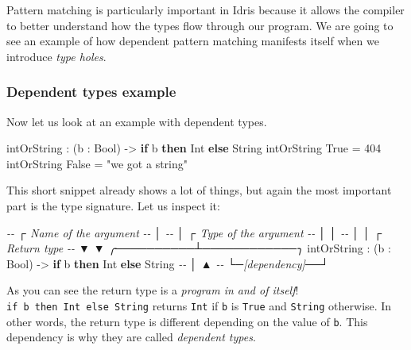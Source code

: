 \documentclass[
]{article}
\newenvironment{Shaded}{}{}
\newcommand{\CommentTok}[1]{\textcolor[rgb]{0.38,0.63,0.69}{\textit{#1}}}
\newcommand{\DataTypeTok}[1]{\textcolor[rgb]{0.56,0.13,0.00}{#1}}
\newcommand{\DecValTok}[1]{\textcolor[rgb]{0.25,0.63,0.44}{#1}}
\newcommand{\KeywordTok}[1]{\textcolor[rgb]{0.00,0.44,0.13}{\textbf{#1}}}
\newcommand{\NormalTok}[1]{#1}
\newcommand{\OperatorTok}[1]{\textcolor[rgb]{0.40,0.40,0.40}{#1}}
\newcommand{\OtherTok}[1]{\textcolor[rgb]{0.00,0.44,0.13}{#1}}
\newcommand{\StringTok}[1]{\textcolor[rgb]{0.25,0.44,0.63}{#1}}
\begin{document}
Pattern matching is particularly important in Idris because it allows
the compiler to better understand how the types flow through our
program. We are going to see an example of how dependent pattern
matching\cite{view_from_the_left} manifests itself when we introduce
\emph{type holes}.

\hypertarget{dependent-types-example}{%
\subsubsection{Dependent types example}\label{dependent-types-example}}

Now let us look at an example with dependent types.

\begin{Shaded}
\begin{Highlighting}[]
\NormalTok{intOrString }\OperatorTok{:}\NormalTok{ (b }\OperatorTok{:} \DataTypeTok{Bool}\NormalTok{) }\OtherTok{{-}\textgreater{}} \KeywordTok{if}\NormalTok{ b }\KeywordTok{then} \DataTypeTok{Int} \KeywordTok{else} \DataTypeTok{String}
\NormalTok{intOrString }\DataTypeTok{True} \OtherTok{=} \DecValTok{404}
\NormalTok{intOrString }\DataTypeTok{False} \OtherTok{=} \StringTok{"we got a string"}
\end{Highlighting}
\end{Shaded}

This short snippet already shows a lot of things, but again the most
important part is the type signature. Let us inspect it:

\begin{Shaded}
\begin{Highlighting}[]
\CommentTok{{-}{-}             ┌ Name of the argument}
\CommentTok{{-}{-}             │}
\CommentTok{{-}{-}             │    ┌ Type of the argument  }
\CommentTok{{-}{-}             │    │ }
\CommentTok{{-}{-}             │    │                  ┌ Return type}
\CommentTok{{-}{-}             ▼    ▼       ╭──────────┴────────────╮  }
\NormalTok{intOrString }\OperatorTok{:}\NormalTok{ (b }\OperatorTok{:} \DataTypeTok{Bool}\NormalTok{) }\OtherTok{{-}\textgreater{}} \KeywordTok{if}\NormalTok{ b }\KeywordTok{then} \DataTypeTok{Int} \KeywordTok{else} \DataTypeTok{String}
\CommentTok{{-}{-}             │               ▲}
\CommentTok{{-}{-}             └─[dependency]──┘}
\end{Highlighting}
\end{Shaded}

As you can see the return type is a \emph{program in and of itself}!
\texttt{if\ b\ then\ Int\ else\ String} returns \texttt{Int} if
\texttt{b} is \texttt{True} and \texttt{String} otherwise. In other
words, the return type is different depending on the value of
\texttt{b}. This dependency is why they are called \emph{dependent
types}.
\end{document}
